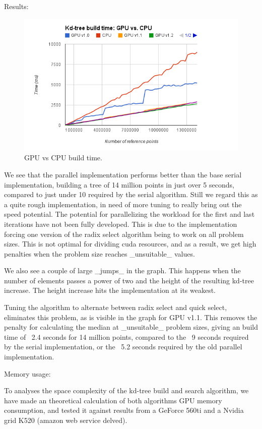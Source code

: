 \begin{enumerate}
\begin{enumerate}
Results:
\begin{figure}[ht!]
\centering
\includegraphics[width=120mm]{gfx/gpu-vs-cpu-build-time.png}

\caption{GPU vs CPU build time.}
\label{fig:sublime_ide}
\end{figure}

We see that the parallel implementation performs better than the base serial implementation, building a tree of 14 million points in just over 5 seconds, compared to just under 10 required by the serial algorithm. Still we regard this as a quite rough implementation, in need of more tuning to really bring out the speed potential. The potential for parallelizing the workload for the first and last iterations have not been fully developed. This is due to the implementation forcing one version of the radix select algorithm being to work on all problem sizes. This is not optimal for dividing cuda resources, and as a result, we get high penalties when the problem size reaches _unsuitable_ values.

We also see a couple of large _jumps_ in the graph. This happens when the number of elements passes a power of two and the height of the resulting kd-tree increase. The height increase hits the implementation at its weakest.

Tuning the algorithm to alternate between radix select and quick select, eliminates this problem, as is visible in the graph for GPU v1.1. This removes the penalty for calculating the median at _unsuitable_ problem sizes, giving an build time of ~2.4 seconds for 14 million points, compared to the ~9 seconds required by the serial implementation, or the ~5.2 seconds required by the old parallel implementation.

Memory usage:

To analyses the space complexity of the kd-tree build and search algorithm, we have made an theoretical calculation of both algorithms GPU memory consumption, and tested it against results from a GeForce 560ti and a Nvidia grid K520 (amazon web service delved).


\end{enumerate}
\end{enumerate}

